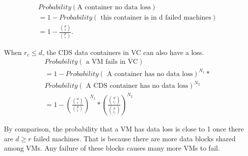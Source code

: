 \begin{multline}
Probability(\mbox{A container no data loss})\\
= 1- Probability (\mbox{ this container is in d failed machines})\\
=  1- \frac{\binom{d}{r}} { \binom{p}{r} }.
\end{multline}

When $r_c \leq d$, the CDS data containers in VC can also have a loss. 
\begin{multline}
Probability (\mbox{ a VM fails in VC})\\
= 1-  Probability(\mbox{ A container has no data loss})^{N_1}* \\
Probability(\mbox{ A CDS container has no data loss})^{N_2}\\
= 1 - 
(\frac{ \binom{d}{r}} { \binom{p}{r} })^{N_1} 
*
(\frac{ \binom{d}{r_c}} { \binom{p}{r_c} })^{N_2} 
\end{multline}

By comparison, the probability that a VM has data loss is close to
1 once  there are  $d \ge r$ failed machines. That is because there are more data blocks
shared among VMs. Any failure of these blocks causes many more VMs to fail.


